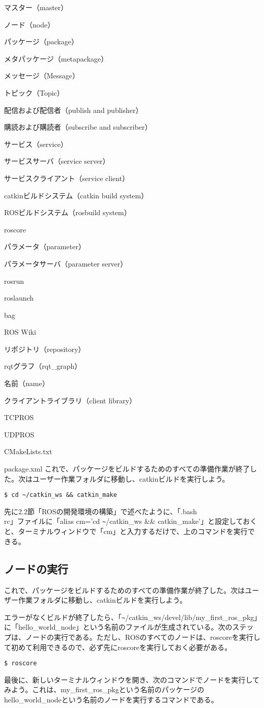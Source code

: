 \begin{term}{マスター（master）}
\begin{term}{ノード（node）}
\begin{term}{パッケージ（package）}
\begin{term}{メタパッケージ（metapackage）}
\begin{term}{メッセージ（Message）}
\begin{term}{トピック（Topic）}
\begin{term}{配信および配信者（publish and publisher）}
\begin{term}{購読および購読者（subscribe and subscriber）}
\begin{term}{サービス（service）}
\begin{term}{サービスサーバ（service server）}
\begin{term}{サービスクライアント（service client）}
\begin{term}{catkinビルドシステム（catkin build system）}
\begin{term}{ROSビルドシステム（rosbuild system）}
\begin{term}{roscore}
\begin{term}{パラメータ（parameter）}
\begin{term}{パラメータサーバ（parameter server）}
\begin{term}{rosrun}
\begin{term}{roslaunch}
\begin{term}{bag}
\begin{term}{ROS Wiki}
\begin{term}{リポジトリ（repository）}
\begin{term}{rqtグラフ（rqt\_graph）}
\begin{term}{名前（name）}
\begin{term}{クライアントライブラリ（client library）}
\begin{term}{TCPROS}
\begin{term}{UDPROS}
\begin{term}{CMakeLists.txt}
\begin{term}{package.xml}
これで、パッケージをビルドするためのすべての準備作業が終了した。次はユーザー作業フォルダに移動し、catkinビルドを実行しよう。

\begin{lstlisting}[language=ROS]
$ cd ~/catkin_ws && catkin_make
\end{lstlisting}

\begin{exercise}[短縮コマンド]
先に2.2節「ROSの開発環境の構築」で述べたように、「.bash\\rc」ファイルに「alias cm='cd \verb|~|/catkin\_ws \&\& catkin\_make'」と設定しておくと、ターミナルウィンドウで「cm」と入力するだけで、上のコマンドを実行できる。
\end{exercise}

\subsection{ノードの実行}

これで、パッケージをビルドするためのすべての準備作業が終了した。次はユーザー作業フォルダに移動し、catkinビルドを実行しよう。

エラーがなくビルドが終了したら、「\verb|~|/catkin\_ws/devel/lib/my\_first\_ros\_pkg」に「hello\_world\_node」という名前のファイルが生成されている。次のステップは、ノードの実行である。ただし、ROSのすべてのノードは、roscoreを実行して初めて利用できるので、必ず先にroscoreを実行しておく必要がある。

\begin{lstlisting}[language=ROS]
$ roscore
\end{lstlisting}

最後に、新しいターミナルウィンドウを開き、次のコマンドでノードを実行してみよう。これは、my\_first\_ros\_pkgという名前のパッケージのhello\_world\_nodeという名前のノードを実行するコマンドである。


\end{term}
\end{term}
\end{term}
\end{term}
\end{term}
\end{term}
\end{term}
\end{term}
\end{term}
\end{term}
\end{term}
\end{term}
\end{term}
\end{term}
\end{term}
\end{term}
\end{term}
\end{term}
\end{term}
\end{term}
\end{term}
\end{term}
\end{term}
\end{term}
\end{term}
\end{term}
\end{term}
\end{term}
